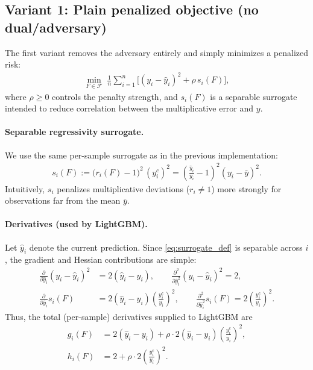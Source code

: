 \documentclass[11pt]{article}
\theoremstyle{plain}
\theoremstyle{definition}
\newcommand{\1}{\mathbf{1}}
\begin{document}
\subsection{Variant 1: Plain penalized objective (no dual/adversary)}
\label{subsec:plain_penalty}

The first variant removes the adversary entirely and simply minimizes a penalized risk:
\begin{align}
\min_{F\in\mathcal{F}}\; \frac{1}{n}\sum_{i=1}^n \Big[ (y_i-\hat y_i)^2 + \rho\, s_i(F)\Big],
\end{align}
where $\rho\ge 0$ controls the penalty strength, and $s_i(F)$ is a separable surrogate intended to reduce correlation between the multiplicative error and $y$.

\paragraph{Separable regressivity surrogate.}
We use the same per-sample surrogate as in the previous implementation:
\begin{align}
 s_i(F) 
 := \big(r_i(F)-1\big)^2\,(y_i^c)^2
 = \left(\frac{\hat y_i}{y_i}-1\right)^2 (y_i-\bar y)^2.
\label{eq:surrogate_def}
\end{align}
Intuitively, $s_i$ penalizes multiplicative deviations ($r_i\neq 1$) more strongly for observations far from the mean $\bar y$.

\paragraph{Derivatives (used by LightGBM).}
Let $\hat y_i$ denote the current prediction. Since \eqref{eq:surrogate_def} is separable across $i$, the gradient and Hessian contributions are simple:
\begin{align}
\frac{\partial}{\partial \hat y_i}(y_i-\hat y_i)^2 &= 2(\hat y_i-y_i),
\qquad \frac{\partial^2}{\partial \hat y_i^2}(y_i-\hat y_i)^2 = 2,\\
\frac{\partial}{\partial \hat y_i}s_i(F)
 &= 2(\hat y_i-y_i)\left(\frac{y_i^c}{y_i}\right)^2,
\qquad \frac{\partial^2}{\partial \hat y_i^2}s_i(F)
 = 2\left(\frac{y_i^c}{y_i}\right)^2.
\label{eq:surrogate_derivatives}
\end{align}
Thus, the total (per-sample) derivatives supplied to LightGBM are
\begin{align}
 g_i(F) &= 2(\hat y_i-y_i) + \rho\cdot 2(\hat y_i-y_i)\left(\frac{y_i^c}{y_i}\right)^2, \\
 h_i(F) &= 2 + \rho\cdot 2\left(\frac{y_i^c}{y_i}\right)^2.
\label{eq:plain_penalty_gh}
\end{align}
\end{document}

